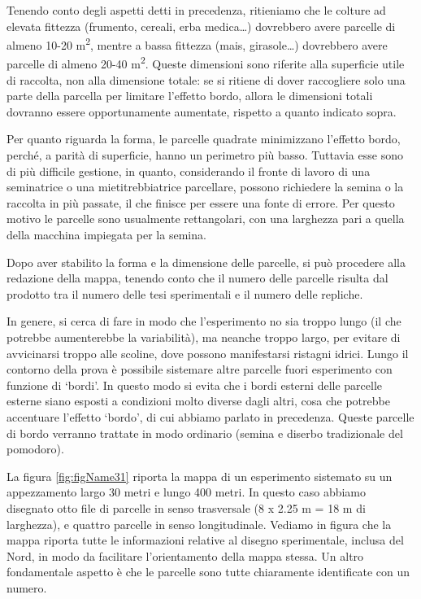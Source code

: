 \documentclass[a4paper,12pt,oneside]{book}
\begin{document}
Tenendo conto degli aspetti detti in precedenza, ritieniamo che le colture ad elevata fittezza (frumento, cereali, erba medica\ldots{}) dovrebbero avere parcelle di almeno 10-20 m\textsuperscript{2}, mentre a bassa fittezza (mais, girasole\ldots{}) dovrebbero avere parcelle di almeno 20-40 m\textsuperscript{2}. Queste dimensioni sono riferite alla superficie utile di raccolta, non alla dimensione totale: se si ritiene di dover raccogliere solo una parte della parcella per limitare l'effetto bordo, allora le dimensioni totali dovranno essere opportunamente aumentate, rispetto a quanto indicato sopra.

Per quanto riguarda la forma, le parcelle quadrate minimizzano l'effetto bordo, perché, a parità di superficie, hanno un perimetro più basso. Tuttavia esse sono di più difficile gestione, in quanto, considerando il fronte di lavoro di una seminatrice o una mietitrebbiatrice parcellare, possono richiedere la semina o la raccolta in più passate, il che finisce per essere una fonte di errore. Per questo motivo le parcelle sono usualmente rettangolari, con una larghezza pari a quella della macchina impiegata per la semina.

Dopo aver stabilito la forma e la dimensione delle parcelle, si può procedere alla redazione della mappa, tenendo conto che il numero delle parcelle risulta dal prodotto tra il numero delle tesi sperimentali e il numero delle repliche.

In genere, si cerca di fare in modo che l'esperimento no sia troppo lungo (il che potrebbe aumenterebbe la variabilità), ma neanche troppo largo, per evitare di avvicinarsi troppo alle scoline, dove possono manifestarsi ristagni idrici. Lungo il contorno della prova è possibile sistemare altre parcelle fuori esperimento con funzione di `bordi'. In questo modo si evita che i bordi esterni delle parcelle esterne siano esposti a condizioni molto diverse dagli altri, cosa che potrebbe accentuare l'effetto `bordo', di cui abbiamo parlato in precedenza. Queste parcelle di bordo verranno trattate in modo ordinario (semina e diserbo tradizionale del pomodoro).

La figura \ref{fig:figName31} riporta la mappa di un esperimento sistemato su un appezzamento largo 30 metri e lungo 400 metri. In questo caso abbiamo disegnato otto file di parcelle in senso trasversale (8 x 2.25 m = 18 m di larghezza), e quattro parcelle in senso longitudinale. Vediamo in figura che la mappa riporta tutte le informazioni relative al disegno sperimentale, inclusa del Nord, in modo da facilitare l'orientamento della mappa stessa. Un altro fondamentale aspetto è che le parcelle sono tutte chiaramente identificate con un numero.
\end{document}
